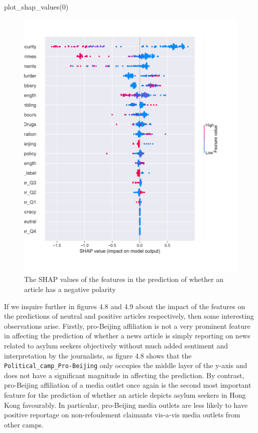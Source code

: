 \documentclass[a4paper, oneside]{report}
\newenvironment{Shaded}{\begin{snugshade}}{\end{snugshade}}
\newcommand{\DecValTok}[1]{\textcolor[rgb]{0.00,0.00,0.81}{#1}}
\newcommand{\NormalTok}[1]{#1}
\renewenvironment{Shaded}
{
  \vspace{4pt}%
  \begin{snugshade}%
}{%
  \end{snugshade}%
  \vspace{4pt}%
}
\begin{document}
\begin{Shaded}
\begin{Highlighting}[]
\NormalTok{plot\_shap\_values(}\DecValTok{0}\NormalTok{)}
\end{Highlighting}
\end{Shaded}

\begin{figure}
\centering
\includegraphics{versions/Chin_Chapter_4_2022-01-10_files/figure-latex/unnamed-chunk-14-3.pdf}
\caption{The SHAP values of the features in the prediction of whether an
article has a negative polarity}
\end{figure}

If we inquire further in figures 4.8 and 4.9 about the impact of the
features on the predictions of neutral and positive articles
respectively, then some interesting observations arise. Firstly,
pro-Beijing affiliation is not a very prominent feature in affecting the
prediction of whether a news article is simply reporting on news related
to asylum seekers objectively without much added sentiment and
interpretation by the journalists, as figure 4.8 shows that the
\texttt{Political\_camp\_Pro-Beijing} only occupies the middle layer of
the y-axis and does not have a significant magnitude in affecting the
prediction. By contrast, pro-Beijing affiliation of a media outlet once
again is the second most important feature for the prediction of whether
an article depicts asylum seekers in Hong Kong favourably. In
particular, pro-Beijing media outlets are less likely to have positive
reportage on non-refoulement claimants vis-a-vis media outlets from
other camps.
\end{document}
